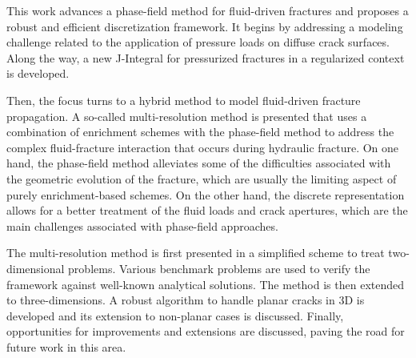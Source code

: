 \abstract




This work advances a phase-field method for fluid-driven fractures and proposes a robust and efficient discretization framework. It begins by addressing a modeling challenge related to the application of pressure loads on diffuse crack surfaces. Along the way, a new J-Integral for pressurized fractures in a regularized context is developed. 

Then, the focus turns to a hybrid method to model fluid-driven fracture propagation. A so-called multi-resolution method is presented that uses a combination of enrichment schemes with the phase-field method to address the complex fluid-fracture interaction that occurs during hydraulic fracture. On one hand, the phase-field method alleviates some of the difficulties associated with the geometric evolution of the fracture, which are usually the limiting aspect of purely enrichment-based schemes. On the other hand, the discrete representation 
allows for a better treatment of the fluid loads and crack apertures, which are the main challenges associated with phase-field approaches. 

The multi-resolution method is first presented in a simplified scheme to treat two-dimensional problems.  Various benchmark problems are used to verify the framework against well-known analytical solutions. The method is then extended to three-dimensions. A robust algorithm to handle planar cracks in 3D is developed and its extension to non-planar cases is discussed. Finally, opportunities for improvements and extensions are discussed, paving the road for future work in this area.